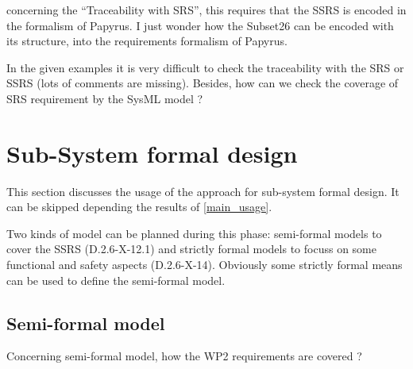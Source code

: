 \begin{assessor1}
concerning the "`Traceability with SRS"', this requires that the SSRS is encoded in the formalism of Papyrus. I just wonder how the Subset26 can be encoded with its structure, into the requirements formalism of Papyrus. 
\end{assessor1}


\begin{assessor2}
In the given examples it is very difficult to check the traceability with the SRS or SSRS (lots of comments are missing). Besides, how can we check the coverage of SRS requirement by the SysML model ?
\end{assessor2}



\section{Sub-System formal design}
This section discusses the usage of the approach for sub-system formal design.
It can be skipped depending the results of \ref{main_usage}.

Two kinds of model can be planned during this phase: semi-formal models to cover the SSRS (D.2.6-X-12.1) and strictly formal models to focuss on some functional and safety aspects (D.2.6-X-14). Obviously some strictly formal means can be used to define the semi-formal model.

\subsection{Semi-formal model}

Concerning semi-formal model, how the WP2 requirements are covered ?

